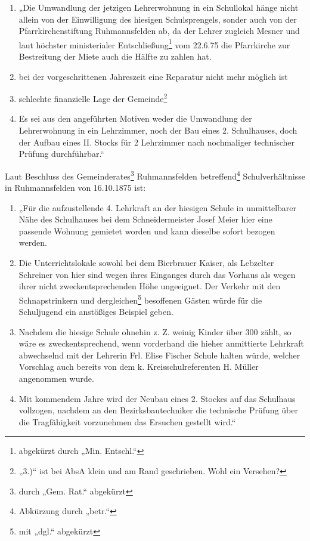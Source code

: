 \documentclass[12pt,a4paper]{book}
\begin{document}
\begin{enumerate}
\item „Die Umwandlung der jetzigen Lehrerwohnung in ein Schullokal hänge nicht
allein von der Einwilligung des hiesigen Schulsprengels, sonder auch von der
Pfarrkirchenstiftung Ruhmannsfelden ab, da der Lehrer zugleich Mesner und laut
höchster ministerialer Entschließung\footnote{abgekürzt durch „Min. Entschl.“}
vom 22.6.75 die Pfarrkirche zur Bestreitung der Miete auch die Hälfte zu zahlen
hat.

\item bei der vorgeschrittenen Jahreszeit eine Reparatur nicht mehr möglich ist

\item schlechte finanzielle Lage der Gemeinde\footnote{„3.)“ ist bei AbsA klein
und am Rand geschrieben. Wohl ein Versehen?}

\item Es sei aus den angeführten Motiven weder die Umwandlung der Lehrerwohnung
in ein Lehrzimmer, noch der Bau eines 2. Schulhauses, doch der Aufbau eines II.
Stocks für 2 Lehrzimmer nach nochmaliger technischer Prüfung durchführbar.“
\end{enumerate}

Laut Beschluss des Gemeinderates\footnote{durch „Gem. Rat.“ abgekürzt}
Ruhmannsfelden betreffend\footnote{Abkürzung durch „betr.“} Schulverhältnisse in
Ruhmannsfelden von 16.10.1875 ist:

\begin{enumerate}
\item „Für die aufzustellende 4. Lehrkraft an der hiesigen Schule in
unmittelbarer Nähe des Schulhauses bei dem Schneidermeister Josef Meier hier
eine passende Wohnung gemietet worden und kann dieselbe sofort bezogen werden.

\item Die Unterrichtslokale sowohl bei dem Bierbrauer Kaiser, als Lebzelter
Schreiner von hier sind wegen ihres Einganges durch das Vorhaus als wegen ihrer
nicht zweckentsprechenden Höhe ungeeignet. Der Verkehr mit den Schnapstrinkern
und dergleichen\footnote{mit „dgl.“ abgekürzt} besoffenen Gästen würde für die
Schuljugend ein anstößiges Beispiel geben.

\item Nachdem die hiesige Schule ohnehin z. Z. weinig Kinder über 300 zählt, so
wäre es zweckentsprechend, wenn vorderhand die hieher anmittierte Lehrkraft
abwechselnd mit der Lehrerin Frl. Elise Fischer Schule halten würde, welcher
Vorschlag auch bereits von dem k. Kreisschulreferenten H. Müller angenommen
wurde.

\item Mit kommendem Jahre wird der Neubau eines 2. Stockes auf das Schulhaus
vollzogen, nachdem an den Bezirksbautechniker die technische Prüfung über die
Tragfähigkeit vorzunehmen das Ersuchen gestellt wird.“
\end{enumerate}
\end{document}
